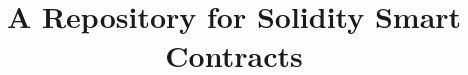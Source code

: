 \documentclass[10pt,conference]{IEEEtran}
\begin{document}
	
	\title{A Repository for Solidity Smart Contracts\\}
	
	
	\maketitle
	
\end{document}
